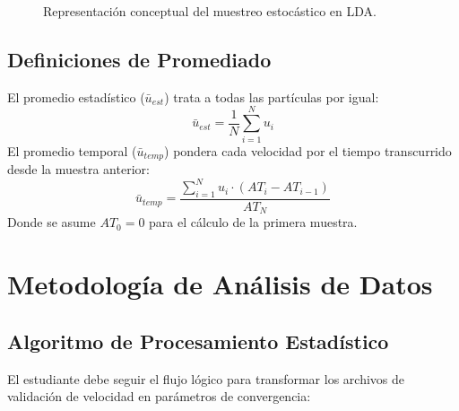 \documentclass[11pt, a4paper]{article}
\begin{document}
\begin{figure}[htbp]
    \centering
    \caption{Representación conceptual del muestreo estocástico en LDA.}
\end{figure}

\subsection{Definiciones de Promediado}
El promedio estadístico ($\bar{u}_{est}$) trata a todas las partículas por igual:
\begin{equation}
    \bar{u}_{est} = \frac{1}{N} \sum_{i=1}^{N} u_i
\end{equation}
El promedio temporal ($\bar{u}_{temp}$) pondera cada velocidad por el tiempo transcurrido desde la muestra anterior:
\begin{equation}
    \bar{u}_{temp} = \frac{\sum_{i=1}^{N} u_i \cdot (AT_i - AT_{i-1})}{AT_N}
\end{equation}
Donde se asume $AT_0 = 0$ para el cálculo de la primera muestra.

\section{Metodología de Análisis de Datos}

\subsection{Algoritmo de Procesamiento Estadístico}
El estudiante debe seguir el flujo lógico para transformar los archivos de validación de velocidad en parámetros de convergencia:
\end{document}
